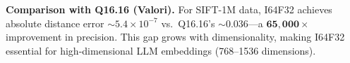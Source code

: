 \documentclass[10pt,journal,compsoc]{IEEEtran}
\begin{document}
\textbf{Comparison with Q16.16 (Valori).} For SIFT-1M data, I64F32 achieves absolute distance error $\sim 5.4 \times 10^{-7}$ vs.\ Q16.16's $\sim 0.036$---a $\mathbf{65{,}000\times}$ improvement in precision. This gap grows with dimensionality, making I64F32 essential for high-dimensional LLM embeddings (768--1536 dimensions).


\balance


\end{document}
